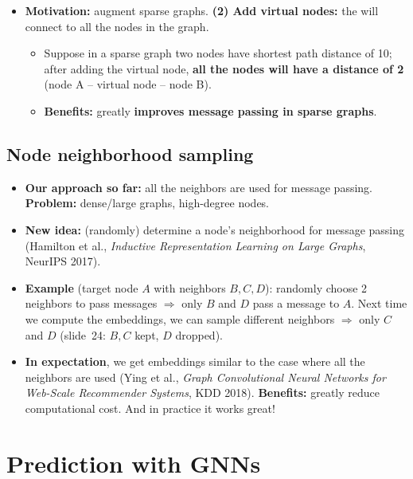 \begin{itemize}
  \item \textbf{Motivation:} augment sparse graphs. \textbf{(2) Add virtual
    nodes:} the  will connect to all the nodes in the graph.
    \begin{itemize}
      \item Suppose in a sparse graph two nodes have shortest path distance of
        10; after adding the virtual node, \textbf{all the nodes will have a
        distance of 2} (node A -- virtual node -- node B).
      \item \textbf{Benefits:} greatly \textbf{improves message passing in
        sparse graphs}.
    \end{itemize}
\end{itemize}

\subsection{Node neighborhood sampling}\label{sec:lec05-sampling}

\begin{itemize}
  \item \textbf{Our approach so far:} all the neighbors are used for message
    passing. \textbf{Problem:} dense/large graphs, high-degree nodes.
  \item \textbf{New idea:} (randomly) determine a node's neighborhood for
    message passing (Hamilton et al., \emph{Inductive Representation Learning
    on Large Graphs}, NeurIPS 2017).
  \item \textbf{Example} (target node $A$ with neighbors $B,C,D$): randomly
    choose 2 neighbors to pass messages $\Rightarrow$ only $B$ and $D$ pass a
    message to $A$. Next time we compute the embeddings, we can sample
    different neighbors $\Rightarrow$ only $C$ and $D$ (slide~24: $B,C$ kept,
    $D$ dropped).
  \item \textbf{In expectation}, we get embeddings similar to the case where
    all the neighbors are used (Ying et al., \emph{Graph Convolutional Neural
    Networks for Web-Scale Recommender Systems}, KDD 2018).
    \textbf{Benefits:} greatly reduce computational cost. And in practice it
    works great!
\end{itemize}

\section{Prediction with GNNs}\label{sec:lec05-pred}

